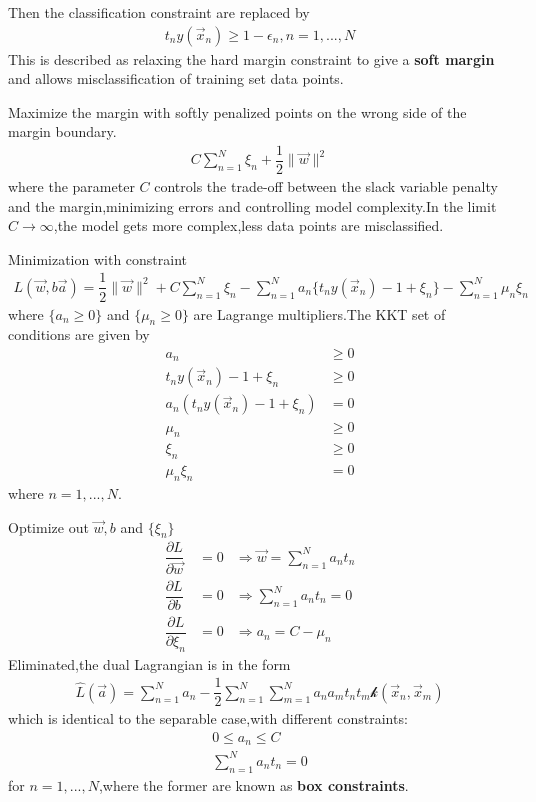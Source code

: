 Then the classification constraint are replaced by
\begin{align}
t_n y(\vec{x}_n) \geq 1-\epsilon_n,n=1,...,N
\end{align}
This is described as relaxing the hard margin constraint to give a \textbf{soft margin} and allows misclassification of training set data points.

Maximize the margin with softly penalized points on the wrong side of the margin boundary.
\begin{align}
C\sum_{n=1}^{N}\xi_n +\dfrac{1}{2}\parallel\vec{w}\parallel^2
\end{align}
where the parameter $C$ controls the trade-off between the slack variable penalty and the margin,minimizing errors and controlling model complexity.In the limit $C\longrightarrow \infty$,the model gets more complex,less data points are misclassified.

Minimization with constraint
\begin{align}
L(\vec{w},b\vec{a}) =\dfrac{1}{2}\parallel\vec{w}\parallel^2+C\sum_{n=1}^{N}\xi_n-\sum_{n=1}^{N}a_n\{t_n y(\vec{x}_n)-1+\xi_n \} -\sum_{n=1}^{N}\mu_n\xi_n
\end{align}
where $\{a_n\geq 0\}$ and $\{\mu_n \geq 0 \}$ are Lagrange multipliers.The KKT set of conditions are given by
\begin{align}
a_n &\geq 0 \\
t_n y(\vec{x}_n)-1+\xi_n &\geq 0 \\
a_n(t_n y(\vec{x}_n)-1+\xi_n) &= 0 \\
\mu_n &\geq 0 \\
\xi_n &\geq 0 \\
\mu_n\xi_n &=0
\end{align}
where $n=1,...,N$.

Optimize out $\vec{w},b$ and $\{\xi_n\}$
\begin{align}
\dfrac{\partial L}{\partial\vec{w}} &=0 &\Rightarrow \vec{w}=\sum_{n=1}^{N}a_n t_n \\ 
\dfrac{\partial L}{\partial b}&=0 &\Rightarrow \sum_{n=1}^{N}a_n t_n =0 \\
\dfrac{\partial L}{\partial \xi_n} &=0 &\Rightarrow a_n = C-\mu_n
\end{align}
Eliminated,the dual Lagrangian is in the form
\begin{align}\label{eqn:SVM Lagrangian}
\hat{L}(\vec{a}) = \sum_{n=1}^{N}a_n -\dfrac{1}{2}\sum_{n=1}^{N}\sum_{m=1}^{N}a_n a_m t_n t_m \mathcal{k}(\vec{x}_n,\vec{x}_m)
\end{align}
which is identical to the separable case,with different constraints:
\begin{align}
0\leq a_n \leq C\\
\sum_{n=1}^{N}a_n t_n = 0
\end{align}
for $n=1,...,N$,where the former are known as \textbf{box constraints}.

